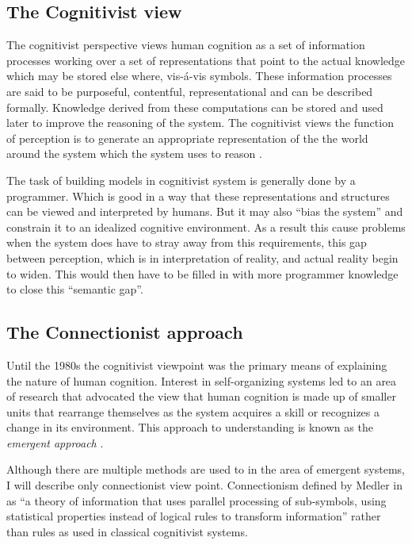 \subsection{The Cognitivist view}
     
     The cognitivist perspective views human cognition as a set of
     information processes working over a set of representations that
     point to the actual knowledge which may be stored else where,
     vis-\'{a}-vis symbols. These information processes are said to be
     purposeful, contentful, representational and can be described
     formally\cite{103009}. Knowledge derived from these computations
     can be stored and used later to improve the reasoning of the
     system. The cognitivist views the function of perception is to
     generate an appropriate representation of the the world around
     the system which the system uses to reason
     \cite{DBLP:journals/tec/VernonMS07}.

     The task of building models in cognitivist system is generally
     done by a programmer. Which is good in a way that these
     representations and structures can be viewed and interpreted by
     humans. But it may also ``bias the system'' and constrain it to an
     idealized cognitive environment. As a result this cause
     problems when the system does have to stray away from this
     requirements, this gap between perception, which is in
     interpretation of reality, and actual reality begin to
     widen. This would then have to be filled in with more programmer
     knowledge to close this ``semantic
     gap''\cite{DBLP:journals/tec/VernonMS07}. 
     
\subsection{The Connectionist approach}


     Until the 1980s the cognitivist viewpoint was the primary means
     of explaining the nature of human cognition. Interest in
     self-organizing systems led to an area of research that advocated
     the view that human cognition is made up of smaller units that
     rearrange themselves as the system acquires a skill or recognizes
     a change in its environment. This approach to understanding is
     known as the \emph{emergent approach}
     \cite{DBLP:journals/tec/VernonMS07}.
     
     Although there are multiple methods are used to in the area of
     emergent systems, I will describe only connectionist view
     point. Connectionism defined by Medler in \cite{Medler98abrief}
     as ``a theory of information that uses parallel processing of
     sub-symbols, using statistical properties instead of logical
     rules to transform information'' rather than rules as used in
     classical cognitivist systems.

